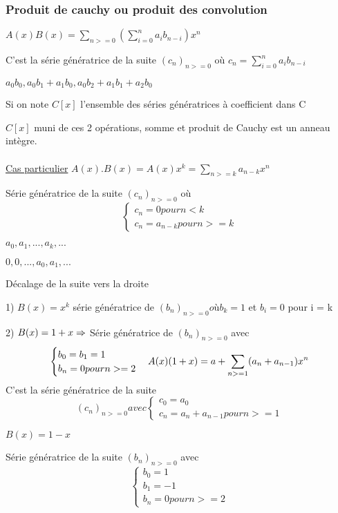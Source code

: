 \subsubsection{Produit de cauchy ou produit des convolution}

$A(x)B(x) = \sum_{n>=0}^{} (\sum_{i=0}^{n} a_i b_{n-i})x^n$

C'est la série génératrice de la suite $(c_n)_{n>=0}$ où $c_n = \sum_{i=0}^na_ib_{n-i}$

$a_0 b_0,a_0 b_1 + a_1 b_0, a_0 b_2 + a_1 b_1 + a_2 b_0$

Si on note $C[x]$ l'ensemble des séries génératrices à coefficient dans C

$C[x]$ muni de ces 2 opérations, somme et produit de Cauchy est un anneau intègre.
\\ \\
\underline{Cas particulier}
$A(x).B(x) = A(x)x^k= \sum_{n>=k}^{} a_{n-k}x^n$

Série génératrice de la suite $(c_n)_{n>=0}$ où
\[ \begin{cases}c_n=0 pour n<k \\
c_n = a_{n-k} pour n>=k \end{cases}\]

$a_0,a_1,...,a_k,...$

$0,0,...    ,a_0,a_1,...$

Décalage de la suite vers la droite

1) $B(x) = x^k$ série génératrice de $(b_n)_{n>=0} où b_k = 1$ et $b_i =0 $ pour  i = k
 
2) $B(x) = 1+ x \Rightarrow $ Série génératrice de $(b_n)_{n>=0}$ avec
\[ \begin{cases}
b_0 = b_1 = 1\\
b_n = 0 pour n >=2
\end{cases}
\\
A(x) ( 1+x) = a + \sum_{n>=1}(a_n + a_{n-1})x^n
\]
C'est la série génératrice de la suite 
\[(c_n)_{n>=0} avec \begin{cases}c_0 = a_0\\c_n = a_n + a_{n-1} pour n >=1\end{cases}\]

$B(x) = 1-x$

Série génératrice de la suite $(b_n)_{n>=0}$ avec 
\[
\begin{cases}
b_0 = 1\\
b_1 = -1\\
b_n = 0 pour n>=2
\end{cases}
\]

